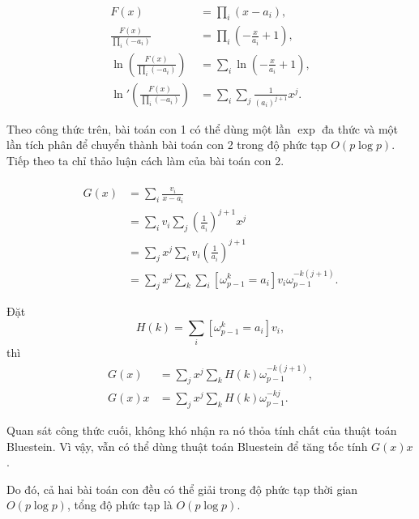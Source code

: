 \documentclass[11pt]{article}
\begin{document}
\paragraph{}

\[
\begin{aligned}
F(x)&=\prod_i(x-a_i),\\
\frac{F(x)}{\prod_i(-a_i)}
&=\prod_i\left(-\frac{x}{a_i}+1\right),\\
\ln\left(\frac{F(x)}{\prod_i(-a_i)}\right)
&=\sum_i\ln\left(-\frac{x}{a_i}+1\right),\\
\ln'\left(\frac{F(x)}{\prod_i(-a_i)}\right)
&=\sum_i\sum_j\frac{1}{(a_i)^{j+1}}x^j.
\end{aligned}
\]

Theo công thức trên, bài toán con 1 có thể dùng một lần \(\exp\) đa thức và một
lần tích phân để chuyển thành bài toán con 2 trong độ phức tạp \(O(p\log p)\).
Tiếp theo ta chỉ thảo luận cách làm của bài toán con 2.

\paragraph{}

\[
\begin{aligned}
G(x)
&=\sum_i\frac{v_i}{x-a_i}\\
&=\sum_i v_i\sum_j\left(\frac1{a_i}\right)^{j+1}x^j\\
&=\sum_j x^j\sum_i v_i\left(\frac1{a_i}\right)^{j+1}\\
&=\sum_j x^j\sum_k\sum_i[\omega_{p-1}^k=a_i]v_i\omega_{p-1}^{-k(j+1)}.
\end{aligned}
\]

Đặt
\[
H(k)=\sum_i[\omega_{p-1}^k=a_i]v_i,
\]
thì
\[
\begin{aligned}
G(x)&=\sum_j x^j\sum_k H(k)\omega_{p-1}^{-k(j+1)},\\
G(x)x&=\sum_j x^j\sum_k H(k)\omega_{p-1}^{-kj}.
\end{aligned}
\]

Quan sát công thức cuối, không khó nhận ra nó thỏa tính chất của thuật toán
Bluestein. Vì vậy, vẫn có thể dùng thuật toán Bluestein để tăng tốc tính
\(G(x)x\).

Do đó, cả hai bài toán con đều có thể giải trong độ phức tạp thời gian
\(O(p\log p)\), tổng độ phức tạp là \(O(p\log p)\).

\paragraph{}
\end{document}
